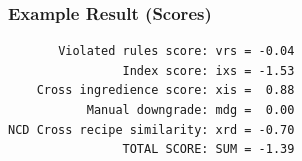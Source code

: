 \documentclass{beamer}
\begin{document}
\begin{frame}[fragile=singleslide]\frametitle{Example Result (Scores)}
\begin{verbatim}
       Violated rules score: vrs = -0.04
                Index score: ixs = -1.53
    Cross ingredience score: xis =  0.88
           Manual downgrade: mdg =  0.00
NCD Cross recipe similarity: xrd = -0.70
                TOTAL SCORE: SUM = -1.39
\end{verbatim}
\end{frame}
\end{document}
